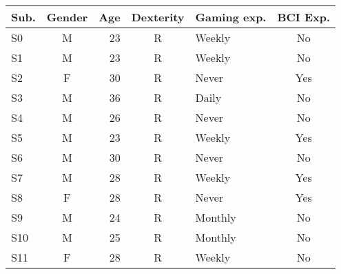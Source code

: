 \begin{tabular}{l | c r c l c}
\hline \hline
Sub. & Gender & Age & Dexterity & Gaming exp. & BCI Exp.\\
\hline
S0 & M  & 23 & R & Weekly & No \\
S1 & M  & 23 & R & Weekly & No \\
S2 & F  & 30 & R & Never  & Yes\\
S3 & M  & 36 & R & Daily  & No \\
S4 & M  & 26 & R & Never  & No \\
S5 & M  & 23 & R & Weekly & Yes\\
S6 & M  & 30 & R & Never  & No \\
S7 & M  & 28 & R & Weekly & Yes\\
S8 & F  & 28 & R & Never  & Yes\\
S9 & M  & 24 & R & Monthly& No \\
S10 & M & 25 & R & Monthly& No \\
S11 & F & 28 & R & Weekly & No \\
\hline
\end{tabular}

